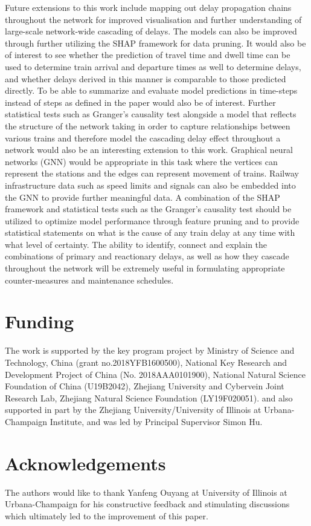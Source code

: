 \documentclass[]{interact}
\theoremstyle{plain}%
\theoremstyle{definition}
\theoremstyle{remark}
\begin{document}
Future extensions to this work include mapping out delay propagation chains throughout the network for improved visualisation and further understanding of large-scale network-wide cascading of delays. The models can also be improved through further utilizing the SHAP framework for data pruning. It would also be of interest to see whether the prediction of travel time and dwell time can be used to determine train arrival and departure times as well to determine delays, and whether delays derived in this manner is comparable to those predicted directly. To be able to summarize and evaluate model predictions in time-steps instead of steps as defined in the paper would also be of interest. Further statistical tests such as Granger's causality test alongside a model that reflects the structure of the network taking in order to capture relationships between various trains and therefore model the cascading delay effect throughout a network would also be an interesting extension to this work. Graphical neural networks (GNN) would be appropriate in this task where the vertices can represent the stations and the edges can represent movement of trains. Railway infrastructure data such as speed limits and signals can also be embedded into the GNN to provide further meaningful data. A combination of the SHAP framework and statistical tests such as the Granger's causality test should be utilized to optimize model performance through feature pruning and to provide statistical statements on what is the cause of any train delay at any time with what level of certainty. The ability to identify, connect and explain the combinations of primary and reactionary delays, as well as how they cascade throughout the network will be extremely useful in formulating appropriate counter-measures and maintenance schedules. 

\section*{Funding}
The work is supported by the key program project by Ministry of Science and Technology, China (grant no.2018YFB1600500), National Key Research and Development Project of China  (No. 2018AAA0101900), National Natural Science Foundation of China (U19B2042), Zhejiang University and Cybervein Joint Research Lab, Zhejiang Natural Science Foundation (LY19F020051). and also supported in part by the Zhejiang University/University of Illinois at Urbana-Champaign Institute, and was led by Principal Supervisor Simon Hu. 

\section*{Acknowledgements}
The authors would like to thank Yanfeng Ouyang at University of Illinois at Urbana-Champaign for his constructive feedback and stimulating discussions which ultimately led to the improvement of this paper. 

\newpage


\end{document}
